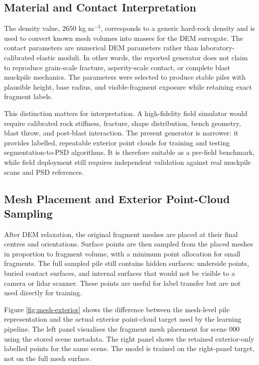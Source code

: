 \documentclass[11pt]{article}
\begin{document}
\subsection{Material and Contact Interpretation}
The density value, 2650 kg m$^{-3}$, corresponds to a generic hard-rock density and is used to convert known mesh volumes into masses for the DEM surrogate. The contact parameters are numerical DEM parameters rather than laboratory-calibrated elastic moduli. In other words, the reported generator does not claim to reproduce grain-scale fracture, asperity-scale contact, or complete blast muckpile mechanics. The parameters were selected to produce stable piles with plausible height, base radius, and visible-fragment exposure while retaining exact fragment labels.

This distinction matters for interpretation. A high-fidelity field simulator would require calibrated rock stiffness, fracture, shape distribution, bench geometry, blast throw, and post-blast interaction. The present generator is narrower: it provides labelled, repeatable exterior point clouds for training and testing segmentation-to-PSD algorithms. It is therefore suitable as a pre-field benchmark, while field deployment still requires independent validation against real muckpile scans and PSD references.

\subsection{Mesh Placement and Exterior Point-Cloud Sampling}
After DEM relaxation, the original fragment meshes are placed at their final centres and orientations. Surface points are then sampled from the placed meshes in proportion to fragment volume, with a minimum point allocation for small fragments. The full sampled pile still contains hidden surfaces: underside points, buried contact surfaces, and internal surfaces that would not be visible to a camera or lidar scanner. These points are useful for label transfer but are not used directly for training.

Figure \ref{fig:mesh-exterior} shows the difference between the mesh-level pile representation and the actual exterior point-cloud target used by the learning pipeline. The left panel visualises the fragment mesh placement for scene 000 using the stored scene metadata. The right panel shows the retained exterior-only labelled points for the same scene. The model is trained on the right-panel target, not on the full mesh surface.
\end{document}

